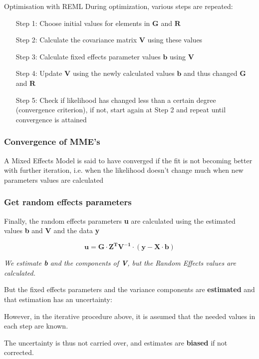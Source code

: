 \documentclass{beamer}
\begin{document}
\begin{frame}{Optimisation with REML}
During optimization, various steps are repeated:
    \vspace{0.2cm}
    
    \begin{enumerate}
        \item[Step 1:] Choose initial values for elements in $\mathbf{G}$ and $\mathbf{R}$
        \item[Step 2:] Calculate the covariance matrix $\mathbf{V}$ using these values
        \item[Step 3:] Calculate fixed effects parameter values $\mathbf{b}$ using $\mathbf{V}$
        \item[Step 4:] Update $\mathbf{V}$ using the newly calculated values $\mathbf{b}$ and thus changed $\mathbf{G}$ and $\mathbf{R}$
        \item[Step 5:] Check if likelihood has changed less than a certain degree (convergence criterion), if not, start again at Step 2 and repeat until convergence is attained
    \end{enumerate}
\end{frame}

\begin{frame}
    \frametitle{Convergence of MME's}
    \large
    A Mixed Effects Model is said to have converged if the fit is not becoming better with further iteration, i.e. when the likelihood doesn't change much when new parameters values are calculated
\end{frame}

\begin{frame}
\frametitle{Get random effects parameters}
    \large
    Finally, the random effects parameters \textbf{u} are calculated using the estimated values \textbf{b} and \textbf{V} and the data \textbf{y}
    \vspace{0.2cm}

    \[
    \mathbf{u} = \mathbf{G} \cdot \mathbf{Z^T} \mathbf{V^{-1}} \cdot (\mathbf{y} - \mathbf{X} \cdot \mathbf{b})
    \]
    \vspace{0.2cm}

    \textit{We estimate \textbf{b} and the components of \textbf{V}, but the Random Effects values are calculated.}
\end{frame}

\begin{frame}
\large
But the fixed effects parameters and the variance components are \textbf{estimated} and that estimation has an uncertainty:
\vspace{0.2cm}

However, in the iterative procedure above, it is assumed that the needed values in each step are known.
\vspace{0.2cm}

The uncertainty is thus not carried over, and estimates are \textbf{biased} if not corrected.
\end{frame}
\end{document}
